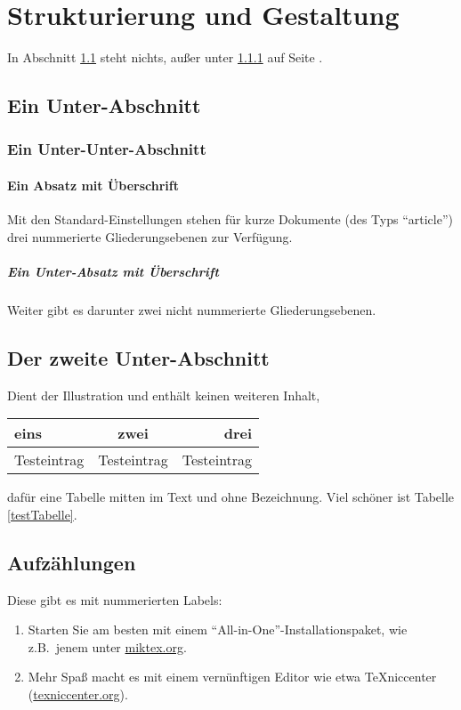 \section{Strukturierung und Gestaltung}
In Abschnitt \ref{leererAbschnitt} steht nichts, außer unter \ref{interessanterUnterabschnitt} auf Seite \pageref{interessanterUnterabschnitt}.


\subsection{Ein Unter-Abschnitt}
\label{leererAbschnitt}



\subsubsection{Ein Unter-Unter-Abschnitt}
\label{interessanterUnterabschnitt}

\paragraph{Ein Absatz mit Überschrift}
Mit den Standard-Einstellungen stehen für kurze Dokumente (des Typs "`article"') drei nummerierte Gliederungsebenen zur Verfügung.

\subparagraph{Ein Unter-Absatz mit Überschrift}
Weiter gibt es darunter zwei nicht nummerierte Gliederungsebenen.



\subsection{Der zweite Unter-Abschnitt}
Dient der Illustration und enthält keinen weiteren Inhalt,
\begin{tabular}{|l|c|r|}
\hline
eins & zwei & drei \\
\hline
Testeintrag & Testeintrag & Testeintrag \\
\hline
\end{tabular}
dafür eine Tabelle mitten im Text und ohne Bezeichnung.
Viel schöner ist Tabelle \ref{testTabelle}.

\subsection{Aufzählungen}
Diese gibt es mit nummerierten Labels:

\begin{enumerate}[$\rightarrow$ 1:]
\item Starten Sie am besten mit einem "`All-in-One"'-Installationspaket, wie z.B.\ jenem unter \url{miktex.org}.

\item Mehr Spaß macht es mit einem vernünftigen Editor wie etwa TeXniccenter (\url{texniccenter.org}).
\end{enumerate}

